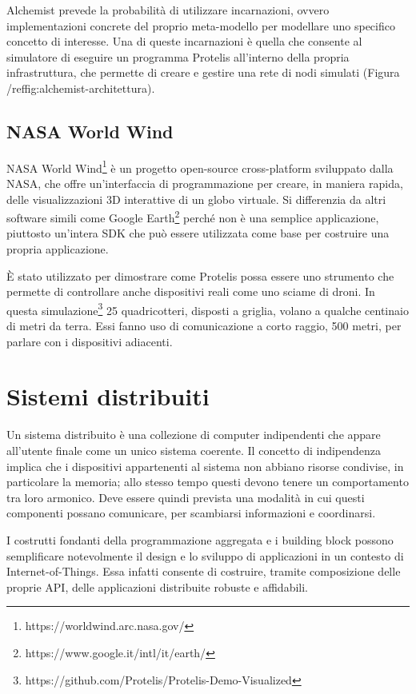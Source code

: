 Alchemist prevede la probabilità di utilizzare incarnazioni, ovvero
implementazioni concrete del proprio meta-modello per modellare uno specifico
concetto di interesse. Una di queste incarnazioni è quella che consente al
simulatore di eseguire un programma Protelis all'interno della propria
infrastruttura, che permette di creare e gestire una rete di nodi simulati
(Figura /ref{fig:alchemist-architettura}).

\subsection{NASA World Wind}
NASA World Wind\footnote{https://worldwind.arc.nasa.gov/} è un progetto
open-source cross-platform sviluppato dalla NASA, che offre un'interfaccia di
programmazione per creare, in maniera rapida, delle visualizzazioni 3D
interattive di un globo virtuale. Si differenzia da altri software simili come
Google Earth\footnote{https://www.google.it/intl/it/earth/} perché non è una
semplice applicazione, piuttosto un'intera SDK che può essere utilizzata come
base per costruire una propria applicazione.

È stato utilizzato per dimostrare come Protelis possa essere uno strumento che
permette di controllare anche dispositivi reali come uno sciame di droni. In
questa
simulazione\footnote{https://github.com/Protelis/Protelis-Demo-Visualized} 25
quadricotteri, disposti a griglia, volano a qualche centinaio di metri da
terra. Essi fanno uso di comunicazione a corto raggio, 500 metri, per parlare
con i dispositivi adiacenti.

\section{Sistemi distribuiti}

Un sistema distribuito è una collezione di computer indipendenti che appare
all'utente finale come un unico sistema coerente\cite{tanenbaum2016}.  Il
concetto di indipendenza implica che i dispositivi appartenenti al sistema non
abbiano risorse condivise, in particolare la memoria; allo stesso tempo questi
devono tenere un comportamento tra loro armonico. Deve essere quindi prevista
una modalità in cui questi componenti possano comunicare, per scambiarsi
informazioni e coordinarsi.

I costrutti fondanti della programmazione aggregata e i building block possono
semplificare notevolmente il design e lo sviluppo di applicazioni in un contesto
di Internet-of-Things\cite{DBLP:journals/computer/BealPV15}. Essa infatti
consente di costruire, tramite composizione delle proprie API, delle
applicazioni distribuite robuste e affidabili.

